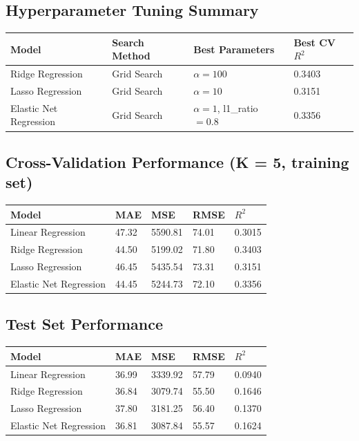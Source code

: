 \documentclass[12pt,a4paper]{article}
\begin{document}
\subsection*{Hyperparameter Tuning Summary}
\begin{longtable}{|p{3.2cm}|p{2.6cm}|p{4.5cm}|p{2.2cm}|}
\hline
\textbf{Model} & \textbf{Search Method} & \textbf{Best Parameters} & \textbf{Best CV $R^2$} \\ \hline
\endhead
Ridge Regression & Grid Search & $\alpha = 100$ & 0.3403 \\ \hline
Lasso Regression & Grid Search & $\alpha = 10$ & 0.3151 \\ \hline
Elastic Net Regression & Grid Search & $\alpha = 1$, l1\_ratio $= 0.8$ & 0.3356 \\ \hline
\end{longtable}

\subsection*{Cross-Validation Performance (K = 5, training set)}
\begin{longtable}{|p{3.6cm}|p{2cm}|p{2.3cm}|p{2.3cm}|p{2cm}|}
\hline
\textbf{Model} & \textbf{MAE} & \textbf{MSE} & \textbf{RMSE} & \textbf{$R^2$} \\ \hline
\endhead
Linear Regression & 47.32 & 5590.81 & 74.01 & 0.3015 \\ \hline
Ridge Regression & 44.50 & 5199.02 & 71.80 & 0.3403 \\ \hline
Lasso Regression & 46.45 & 5435.54 & 73.31 & 0.3151 \\ \hline
Elastic Net Regression & 44.45 & 5244.73 & 72.10 & 0.3356 \\ \hline
\end{longtable}

\subsection*{Test Set Performance}
\begin{longtable}{|p{3.6cm}|p{2cm}|p{2.3cm}|p{2.3cm}|p{2cm}|}
\hline
\textbf{Model} & \textbf{MAE} & \textbf{MSE} & \textbf{RMSE} & \textbf{$R^2$} \\ \hline
\endhead
Linear Regression & 36.99 & 3339.92 & 57.79 & 0.0940 \\ \hline
Ridge Regression & 36.84 & 3079.74 & 55.50 & 0.1646 \\ \hline
Lasso Regression & 37.80 & 3181.25 & 56.40 & 0.1370 \\ \hline
Elastic Net Regression & 36.81 & 3087.84 & 55.57 & 0.1624 \\ \hline
\end{longtable}
\end{document}
